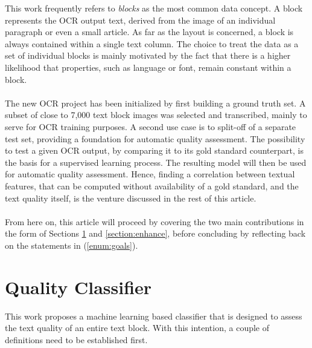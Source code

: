\documentclass{jdmdh}
\begin{document}
\noindent This work frequently refers to \textit{blocks} as the most common data concept. A block represents the OCR output text, derived from the image of an individual paragraph or even a small article. As far as the layout is concerned, a block is always contained within a single text column. The choice to treat the data as a set of individual blocks is mainly motivated by the fact that there is a higher likelihood that properties, such as language or font, remain constant within a block.
\\ \\
The new OCR project has been initialized by first building a ground truth set. A subset of close to 7,000 text block images was selected and transcribed, mainly to serve for OCR training purposes. A second use case is to split-off of a separate test set, providing a foundation for automatic quality assessment. The possibility to test a given OCR output, by comparing it to its gold standard counterpart, is the basis for a supervised learning process. The resulting model will then be used for automatic quality assessment. Hence, finding a correlation between textual features, that can be computed without availability of a gold standard, and the text quality itself, is the venture discussed in the rest of this article.
\\ \\
From here on, this article will proceed by covering the two main contributions in the form of Sections \ref{section:qualityclassifier} and \ref{section:enhance}, before concluding by reflecting back on the statements in (\ref{enum:goals}).
\newpage
\section{Quality Classifier} \label{section:qualityclassifier}
This work proposes a machine learning based classifier that is designed to assess the text quality of an entire text block. With this intention, a couple of definitions need to be established first.
\end{document}
